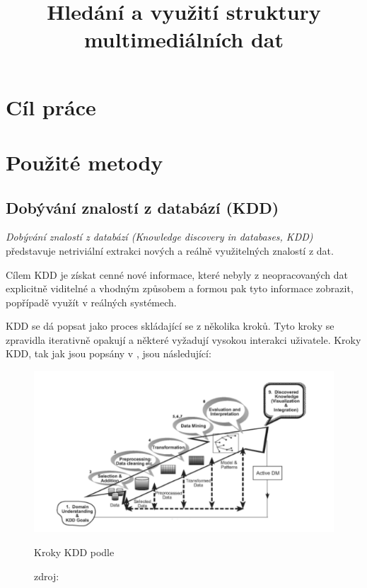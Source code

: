 \documentclass[thesis=M,czech]{FITthesis}[2012/06/26]
\title{Hledání a využití struktury multimediálních dat}
\begin{document}
\renewcommand\listingscaption{Ukázka}

\begin{introduction}
\end{introduction}

\chapter{Cíl práce}

\chapter{Použité metody}
\section{Dobývání znalostí z databází (KDD)}
\textit{Dobývání znalostí z databází (Knowledge discovery in databases, KDD)} představuje netriviální extrakci nových a reálně využitelných znalostí z dat\cite{kddb}. 

Cílem KDD je získat cenné nové informace, které nebyly z neopracovaných dat explicitně viditelné a vhodným způsobem a formou pak tyto informace zobrazit, popřípadě využít v reálných systémech.\cite{fayyad}

KDD se dá popsat jako proces skládající se z několika kroků. Tyto kroky se zpravidla iterativně opakují a některé vyžadují vysokou interakci uživatele. Kroky KDD, tak jak jsou popsány v \cite{hbcap}, jsou následující:

\begin{figure}[htbp]
\begin{center}
	\includegraphics[scale=0.75]{kdd_steps}
\caption{Kroky KDD podle \cite{fayyad}}
\end{center}
  \caption*{zdroj: \cite{fayyad}}
\end{figure}
\end{document}

